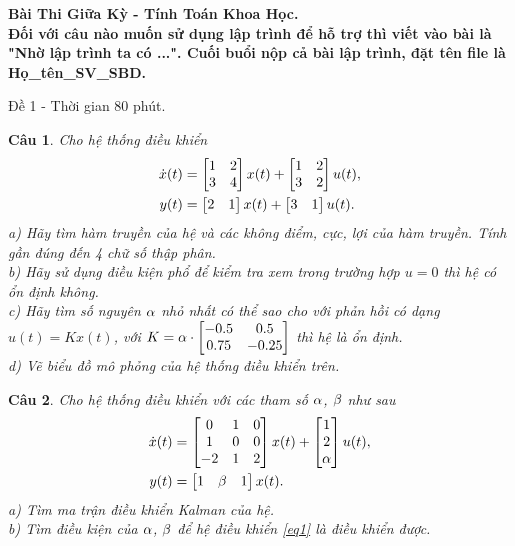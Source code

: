 \documentclass[11pt]{article}
\newtheorem{bt}{Câu}
\begin{document}



\begin{center}
	{\bf Bài Thi Giữa Kỳ - Tính Toán Khoa Học. \\
	 Đối với câu nào muốn sử dụng lập trình để hỗ trợ thì viết vào bài là "Nhờ lập trình ta có ...". Cuối buổi nộp cả bài lập trình, đặt tên file là Họ\_tên\_SV\_SBD.}
\end{center}

\begin{center}
	Đề 1 - Thời gian 80 phút.
\end{center}

\begin{bt}\label{Câu 1}
Cho hệ thống điều khiển
%
\begin{align}\label{eq0}
	\dot{x}(t) &= \begin{bmatrix} 1 & 2 \\ 3 & 4 \end{bmatrix} x(t) + \begin{bmatrix} 1 & 2 \\ 3 & 2 \end{bmatrix} u(t), \\
	y(t) &= \begin{bmatrix} 2 & 1 \end{bmatrix} x(t) + \begin{bmatrix} 3 & 1 \end{bmatrix} u(t). 
\end{align}
%
a) Hãy tìm hàm truyền của hệ và các không điểm, cực, lợi của hàm truyền. Tính gần đúng đến 4 chữ số thập phân. \\
b) Hãy sử dụng điều kiện phổ để kiểm tra xem trong trường hợp $u=0$ thì hệ có ổn định không. \\
c) Hãy tìm số nguyên $\alpha$ nhỏ nhất có thể sao cho với phản hồi có dạng $u(t) = K x(t)$, với $K = \alpha \cdot \begin{bmatrix}  -0.5 & 0.5 \\ 0.75 & -0.25 \end{bmatrix}$ thì hệ là ổn định. \\ 
d) Vẽ biểu đồ mô phỏng của hệ thống điều khiển trên.
\end{bt}

\begin{bt}
Cho hệ thống điều khiển với các tham số $\alpha$, $\beta$ như sau
%
\begin{align}\label{eq1}
	\dot{x}(t) &= \begin{bmatrix} 0 & 1 & 0 \\ 1 & 0 & 0 \\ -2 & 1 & 2 \end{bmatrix} x(t) + \begin{bmatrix} 1 \\ 2 \\ \alpha \end{bmatrix} u(t), \\
	y(t) &= \begin{bmatrix} 1 & \beta & 1 \end{bmatrix} x(t). 
\end{align}
%
a) Tìm ma trận điều khiển Kalman của hệ. \\
b) Tìm điều kiện của $\alpha$, $\beta$ để hệ điều khiển \eqref{eq1} là điều khiển được. \\
\end{bt}
\end{document}
